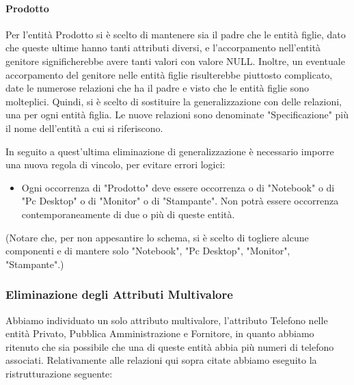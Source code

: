 \paragraph{Prodotto}
Per l'entità Prodotto si è scelto di mantenere sia il padre che le entità figlie, dato che queste ultime hanno tanti attributi diversi, e l'accorpamento nell'entità genitore significherebbe avere tanti valori con valore NULL. Inoltre, un eventuale accorpamento del genitore nelle entità figlie risulterebbe piuttosto complicato, date le numerose relazioni che ha il padre e visto che le entità figlie sono molteplici.
Quindi, si è scelto di sostituire la generalizzazione con delle relazioni, una per ogni entità figlia. Le nuove relazioni sono denominate "Specificazione" più il nome dell'entità a cui si riferiscono.

In seguito a quest'ultima eliminazione di generalizzazione è necessario imporre una nuova regola di vincolo, per evitare errori logici:

\begin{itemize}
  \item Ogni occorrenza di "Prodotto" deve essere occorrenza o di "Notebook" o di "Pc Desktop" o di "Monitor" o di "Stampante". Non potrà essere occorrenza contemporaneamente di due o più di queste entità.
\end{itemize}

(Notare che, per non appesantire lo schema, si è scelto di togliere alcune componenti e di mantere solo "Notebook", "Pc Desktop", "Monitor", "Stampante".)




%
%
%
% 
%


\newpage
\subsubsection{Eliminazione degli Attributi Multivalore}

Abbiamo individuato un solo attributo multivalore, l'attributo Telefono nelle entità Privato, Pubblica Amministrazione e Fornitore, in quanto abbiamo ritenuto che sia possibile che una di queste entità abbia più numeri di telefono associati.
\newline
Relativamente alle relazioni qui sopra citate abbiamo eseguito la ristrutturazione seguente:
\newline\newline

